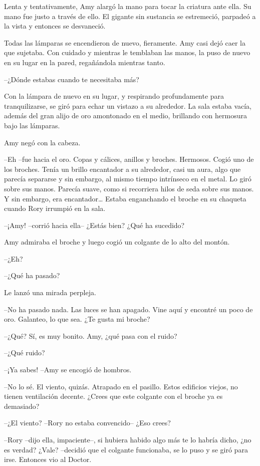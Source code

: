 {Lenta y tentativamente, Amy alargó la mano para tocar la criatura ante
	ella. Su mano fue justo a través de ello. El gigante sin sustancia se
estremeció, parpadeó a la vista y entonces se desvaneció.}

{Todas las lámparas se encendieron de nuevo, fieramente. Amy casi dejó
	caer la que sujetaba. Con cuidado y mientras le temblaban las manos, la
puso de nuevo en su lugar en la pared, regañándola mientras tanto.}

{--¿Dónde estabas cuando te necesitaba más?}

{Con la lámpara de nuevo en su lugar, y respirando profundamente para
	tranquilizarse, se giró para echar un vistazo a su alrededor. La sala
	estaba vacía, además del gran alijo de oro amontonado en el medio,
brillando con hermosura bajo las lámparas.}

{Amy negó con la cabeza.}

{--Eh --fue hacia el oro. Copas y cálices, anillos y broches.
	Hermosos. Cogió uno de los broches. Tenía un brillo encantador a su
	alrededor, casi un aura, algo que parecía separarse y sin embargo, al
	mismo tiempo intrínseco en el metal. Lo giró sobre sus manos. Parecía
	suave, como si recorriera hilos de seda sobre sus manos. Y sin embargo,
	era encantador\ldots{} Estaba enganchando el broche en su chaqueta
cuando Rory irrumpió en la sala.}

{--¡Amy! --corrió hacia ella-- ¿Estás bien? ¿Qué ha sucedido?}

{Amy admiraba el broche y luego cogió un colgante de lo alto del
montón.}

{--¿Eh?}

{--¿Qué ha pasado?}

{Le lanzó una mirada perpleja.}

{--No ha pasado nada. Las luces se han apagado. Vine aquí y encontré
un poco de oro. Galanteo, lo que sea. ¿Te gusta mi broche?}

{--¿Qué? Sí, es muy bonito. Amy, ¿qué pasa con el ruido?}

{--¿Qué ruido?}

{--¡Ya sabes! --Amy se encogió de hombros.}

{--No lo sé. El viento, quizás. Atrapado en el pasillo. Estos
	edificios viejos, no tienen ventilación decente. ¿Crees que este
colgante con el broche ya es demasiado?}

{--¿El viento? --Rory no estaba convencido-- ¿Eso crees?}

{--Rory --dijo ella, impaciente--, si hubiera habido algo más te lo
	habría dicho, ¿no es verdad? ¿Vale? --decidió que el colgante
funcionaba, se lo puso y se giró para irse. Entonces vio al Doctor.}

